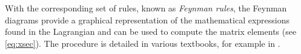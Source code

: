 With the corresponding set of rules, known as \emph{Feynman rules}, the Feynman diagrams provide a graphical representation of the mathematical expressions found in the Lagrangian and can be used to compute the matrix elements (see \cref{eq:xsec}). 
The procedure is detailed in various textbooks, for example in .




